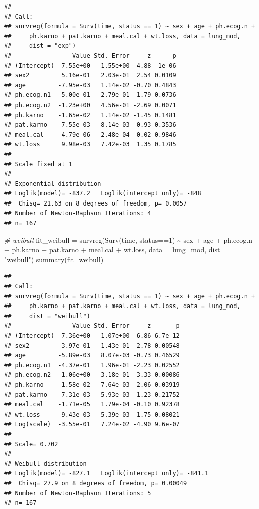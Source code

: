 \documentclass[
]{article}
\newenvironment{Shaded}{\begin{snugshade}}{\end{snugshade}}
\newcommand{\AttributeTok}[1]{\textcolor[rgb]{0.77,0.63,0.00}{#1}}
\newcommand{\CommentTok}[1]{\textcolor[rgb]{0.56,0.35,0.01}{\textit{#1}}}
\newcommand{\DecValTok}[1]{\textcolor[rgb]{0.00,0.00,0.81}{#1}}
\newcommand{\FunctionTok}[1]{\textcolor[rgb]{0.00,0.00,0.00}{#1}}
\newcommand{\NormalTok}[1]{#1}
\newcommand{\OtherTok}[1]{\textcolor[rgb]{0.56,0.35,0.01}{#1}}
\newcommand{\SpecialCharTok}[1]{\textcolor[rgb]{0.00,0.00,0.00}{#1}}
\newcommand{\StringTok}[1]{\textcolor[rgb]{0.31,0.60,0.02}{#1}}
\begin{document}
\begin{verbatim}
## 
## Call:
## survreg(formula = Surv(time, status == 1) ~ sex + age + ph.ecog.n + 
##     ph.karno + pat.karno + meal.cal + wt.loss, data = lung_mod, 
##     dist = "exp")
##                 Value Std. Error     z      p
## (Intercept)  7.55e+00   1.55e+00  4.88  1e-06
## sex2         5.16e-01   2.03e-01  2.54 0.0109
## age         -7.95e-03   1.14e-02 -0.70 0.4843
## ph.ecog.n1  -5.00e-01   2.79e-01 -1.79 0.0736
## ph.ecog.n2  -1.23e+00   4.56e-01 -2.69 0.0071
## ph.karno    -1.65e-02   1.14e-02 -1.45 0.1481
## pat.karno    7.55e-03   8.14e-03  0.93 0.3536
## meal.cal     4.79e-06   2.48e-04  0.02 0.9846
## wt.loss      9.98e-03   7.42e-03  1.35 0.1785
## 
## Scale fixed at 1 
## 
## Exponential distribution
## Loglik(model)= -837.2   Loglik(intercept only)= -848
##  Chisq= 21.63 on 8 degrees of freedom, p= 0.0057 
## Number of Newton-Raphson Iterations: 4 
## n= 167
\end{verbatim}

\begin{Shaded}
\begin{Highlighting}[]
\CommentTok{\# weibull}
\NormalTok{fit\_weibull }\OtherTok{=} \FunctionTok{survreg}\NormalTok{(}\FunctionTok{Surv}\NormalTok{(time, status}\SpecialCharTok{==}\DecValTok{1}\NormalTok{) }\SpecialCharTok{\textasciitilde{}}\NormalTok{ sex }\SpecialCharTok{+}\NormalTok{ age }\SpecialCharTok{+}\NormalTok{ ph.ecog.n }\SpecialCharTok{+}\NormalTok{ ph.karno }\SpecialCharTok{+}\NormalTok{ pat.karno }\SpecialCharTok{+}\NormalTok{ meal.cal }\SpecialCharTok{+}\NormalTok{ wt.loss,}
                      \AttributeTok{data =}\NormalTok{ lung\_mod, }\AttributeTok{dist =} \StringTok{"weibull"}\NormalTok{)}
\FunctionTok{summary}\NormalTok{(fit\_weibull)}
\end{Highlighting}
\end{Shaded}

\begin{verbatim}
## 
## Call:
## survreg(formula = Surv(time, status == 1) ~ sex + age + ph.ecog.n + 
##     ph.karno + pat.karno + meal.cal + wt.loss, data = lung_mod, 
##     dist = "weibull")
##                 Value Std. Error     z       p
## (Intercept)  7.36e+00   1.07e+00  6.86 6.7e-12
## sex2         3.97e-01   1.43e-01  2.78 0.00548
## age         -5.89e-03   8.07e-03 -0.73 0.46529
## ph.ecog.n1  -4.37e-01   1.96e-01 -2.23 0.02552
## ph.ecog.n2  -1.06e+00   3.18e-01 -3.33 0.00086
## ph.karno    -1.58e-02   7.64e-03 -2.06 0.03919
## pat.karno    7.31e-03   5.93e-03  1.23 0.21752
## meal.cal    -1.71e-05   1.79e-04 -0.10 0.92378
## wt.loss      9.43e-03   5.39e-03  1.75 0.08021
## Log(scale)  -3.55e-01   7.24e-02 -4.90 9.6e-07
## 
## Scale= 0.702 
## 
## Weibull distribution
## Loglik(model)= -827.1   Loglik(intercept only)= -841.1
##  Chisq= 27.9 on 8 degrees of freedom, p= 0.00049 
## Number of Newton-Raphson Iterations: 5 
## n= 167
\end{verbatim}
\end{document}
